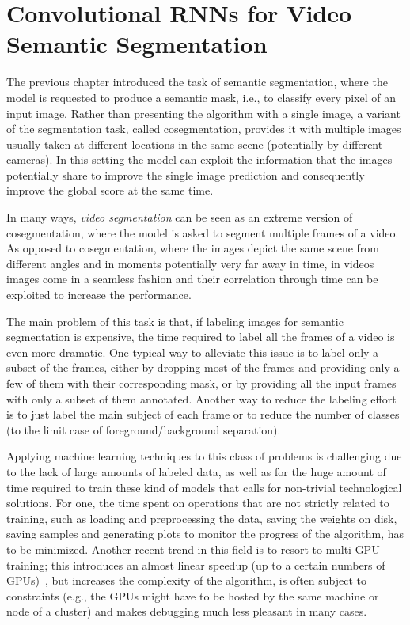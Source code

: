 \chapter{Convolutional RNNs for Video Semantic Segmentation}\label{sec:video_segmentation}

The previous chapter introduced the task of semantic segmentation, where the
model is requested to produce a semantic mask, i.e., to classify every pixel of
an input image. Rather than presenting the algorithm with a single image, a
variant of the segmentation task, called cosegmentation, provides it with
multiple images usually taken at different locations in the same scene
(potentially by different cameras). In this setting the model can exploit the
information that the images potentially share to improve the single image
prediction and consequently improve the global score at the same time.

In many ways, \emph{video segmentation} can be seen as an extreme version of
cosegmentation, where the model is asked to segment multiple frames of a video.
As opposed to cosegmentation, where the images depict the same scene from
different angles and in moments potentially very far away in time, in videos
images come in a seamless fashion and their correlation through time can be
exploited to increase the performance.

The main problem of this task is that, if labeling images for semantic
segmentation is expensive, the time required to label all the frames of a
video is even more dramatic. One typical way to alleviate this issue is to
label only a subset of the frames, either by dropping most of the frames and
providing only a few of them with their corresponding mask, or by providing all
the input frames with only a subset of them annotated. Another way to reduce
the labeling effort is to just label the main subject of each frame or to
reduce the number of classes (to the limit case of foreground/background
separation).

Applying machine learning techniques to this class of problems is challenging
due to the lack of large amounts of labeled data, as well as for the huge
amount of time required to train these kind of models that calls for
non-trivial technological solutions. For one, the time spent on operations that
are not strictly related to training, such as loading and preprocessing the
data, saving the weights on disk, saving samples and generating plots to
monitor the progress of the algorithm, has to be minimized. Another recent
trend in this field is to resort to multi-GPU training; this introduces an
almost linear speedup (up to a certain numbers of GPUs)~\citep{
theano2016short,ma2016theano}, but increases the complexity of the algorithm,
is often subject to constraints (e.g., the GPUs might have to be hosted by the
same machine or node of a cluster) and makes debugging much less pleasant in
many cases.

